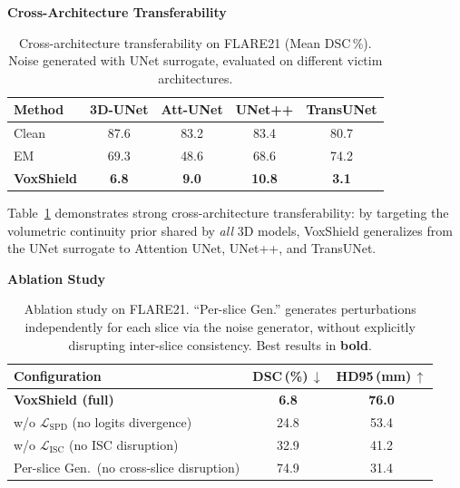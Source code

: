\documentclass[runningheads]{llncs}
\begin{document}
\textbf{Cross-Architecture Transferability}

\begin{table}[t]
\centering
\caption{Cross-architecture transferability on FLARE21 (Mean DSC\,\%). Noise generated with UNet surrogate, evaluated on different victim architectures.}\label{tab:transfer}
\setlength{\tabcolsep}{6pt}
\begin{tabular}{lcccc}
\toprule
Method & 3D-UNet & Att-UNet & UNet++ & TransUNet \\
\midrule
Clean     & 87.6 & 83.2   & 83.4   & 80.7 \\
EM       & 69.3   & 48.6   & 68.6   & 74.2 \\
\textbf{VoxShield}  & \textbf{6.8} & \textbf{9.0} & \textbf{10.8} & \textbf{3.1} \\
\bottomrule
\end{tabular}
\end{table}

Table~\ref{tab:transfer} demonstrates strong cross-architecture transferability: by targeting the volumetric continuity prior shared by \textit{all} 3D models, VoxShield generalizes from the UNet surrogate to Attention UNet, UNet++, and TransUNet.

\textbf{Ablation Study}

\begin{table}[t]
\centering
\caption{Ablation study on FLARE21. ``Per-slice Gen.'' generates
  perturbations independently for each slice via the noise generator,
  without explicitly disrupting inter-slice consistency.
  Best results in \textbf{bold}.}\label{tab:ablation}
\setlength{\tabcolsep}{6pt}
\begin{tabular}{lcc}
\toprule
Configuration & DSC\,(\%)\,$\downarrow$ & HD95\,(mm)\,$\uparrow$ \\
\midrule
\textbf{VoxShield (full)}
  & \textbf{6.8}  & \textbf{76.0} \\
\midrule
w/o $\mathcal{L}_{\text{SPD}}$ (no logits divergence)
  & 24.8    & 53.4 \\
w/o $\mathcal{L}_{\text{ISC}}$ (no ISC disruption)
  & 32.9  & 41.2 \\
Per-slice Gen.\ (no cross-slice disruption)
  & 74.9    & 31.4 \\
\bottomrule
\end{tabular}
\end{table}
\end{document}
